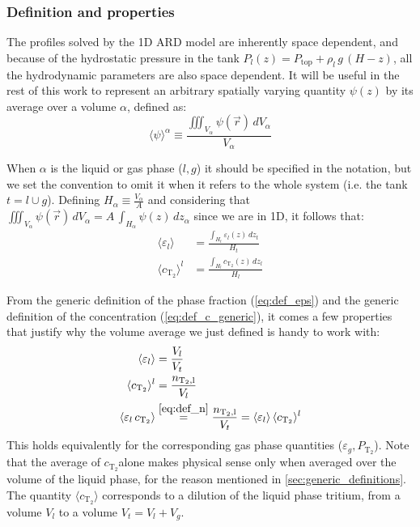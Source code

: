 \documentclass[a4paper,11pt,oneside]{report}
\newcommand{\PT}{\ensuremath{P_\mathrm{T_2}}}
\newcommand{\CT}{\ensuremath{c_\mathrm{T_2}}}
\newcommand{\NTl}{\ensuremath{n_\mathrm{T_2,l}}}
\begin{document}
\subsubsection{Definition and properties} 

The profiles solved by the 1D ARD model are inherently space dependent, and because of the hydrostatic pressure in the tank $P_l(z)=P_\mathrm{top}+\rho_l\,g\,(H-z)$, all the hydrodynamic parameters are also space dependent. It will be useful in the rest of this work to represent an arbitrary spatially varying quantity $\psi(z)$ by its average over a volume $\alpha$, defined as:
\begin{equation}
    \label{eq:def_average}
    \boxed{\langle \psi \rangle^\alpha \equiv \frac{\iiint_{V_\alpha}\psi(\vec r) \,dV_\alpha}{V_\alpha}}
\end{equation}

When $\alpha$ is the liquid or gas phase ($l,g$) it should be specified in the notation, but we set the convention to omit it when it refers to the whole system (i.e. the tank $t=l \cup g$). Defining $H_\alpha\equiv\frac{V_\alpha}{A}$ and considering that $\iiint_{V_\alpha}\psi(\vec r) \,dV_\alpha=A\,\int_{H_\alpha}\psi(z)\,dz_\alpha$ since we are in 1D, it follows that:
\begin{align}
    \langle \varepsilon_l \rangle &= \frac{\int_{H_t}\varepsilon_l(z) \,dz_t}{H_t}\\
    \langle \CT \rangle^l &= \frac{\int_{H_l}\CT(z) \,dz_l}{H_l} 
\end{align}

From the generic definition of the phase fraction (\cref{eq:def_eps}) and the generic definition of the concentration (\cref{eq:def_c_generic}), it comes a few properties that justify why the volume average we just defined is handy to work with:
\begin{align}
    \langle \varepsilon_l \rangle& = \frac{V_l}{V_t} \\
    \langle \CT \rangle^l &= \frac{\NTl}{V_l} \\
    \langle \varepsilon_l\,\CT \rangle &\stackrel{\eqref{eq:def_n}}{=} \frac{\NTl}{V_t}=\langle \varepsilon_l \rangle \, \langle \CT \rangle^l \label{eq:prop_separable}
\end{align} 
This holds equivalently for the corresponding gas phase quantities ($\varepsilon_g,\PT$). Note that the average of \CT alone makes physical sense only when averaged over the volume of the liquid phase, for the reason mentioned in \cref{sec:generic_definitions}. The quantity $\langle \CT \rangle$ corresponds to a dilution of the liquid phase tritium, from a volume $V_l$ to a volume $V_t=V_l+V_g$.
\end{document}
